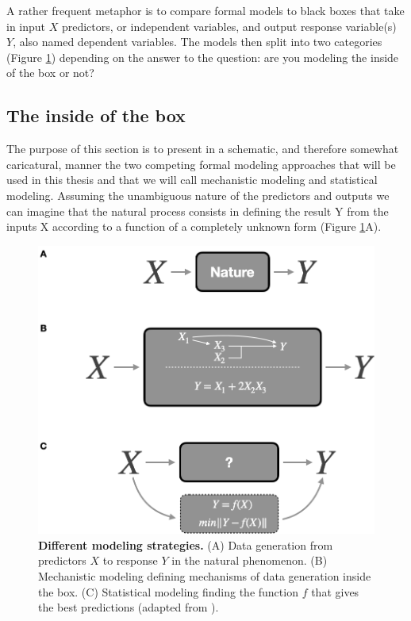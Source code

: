 \documentclass[a4paper,12pt,twoside,onecolumn,openright,final,oldfontcommands]{memoir}
\begin{document}
A rather frequent metaphor is to compare formal models to black boxes
that take in input \(X\) predictors, or independent variables, and
output response variable(s) \(Y\), also named dependent variables. The
models then split into two categories (Figure \ref{fig:boxes}) depending
on the answer to the question: are you modeling the inside of the box or
not?

\subsection{The inside of the box}\label{the-inside-of-the-box}

The purpose of this section is to present in a schematic, and therefore
somewhat caricatural, manner the two competing formal modeling
approaches that will be used in this thesis and that we will call
mechanistic modeling and statistical modeling. Assuming the unambiguous
nature of the predictors and outputs we can imagine that the natural
process consists in defining the result Y from the inputs X according to
a function of a completely unknown form (Figure \ref{fig:boxes}A).

\begin{figure}

{\centering \includegraphics[width=0.6\linewidth]{fig/boxes} 

}

\caption[Different modeling strategies.]{\textbf{Different modeling strategies.} (A) Data
generation from predictors \(X\) to response \(Y\) in the natural
phenomenon. (B) Mechanistic modeling defining mechanisms of data
generation inside the box. (C) Statistical modeling finding the function
\(f\) that gives the best predictions (adapted from
\citet{breiman2001statistical}).}\label{fig:boxes}
\end{figure}
\end{document}
